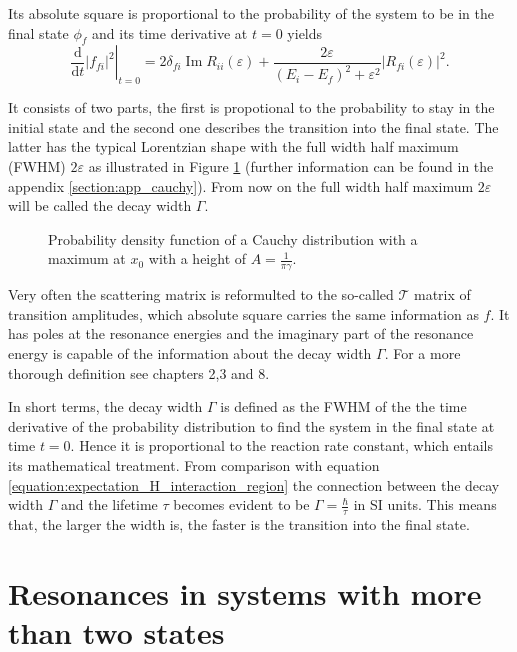 Its absolute square is proportional to the probability of the system to be
in the final state $\phi_f$ and its time derivative at $t=0$ yields
\begin{equation}
  \left . \frac{\mathrm{d}}{\mathrm{d}t} |f_{fi}|^2 \right |_{t=0}
  = 2\delta_{fi} \operatorname{Im}R_{ii}(\varepsilon) 
    + \frac{2\varepsilon}{(E_i-E_f)^2+\varepsilon^2} |R_{fi}(\varepsilon)|^2 .
\end{equation}

It consists of two parts, the first is propotional to the probability to stay
in the initial state and the second one describes the transition into the
final state. The latter has the typical Lorentzian shape with the full width
half maximum
(FWHM) $2 \varepsilon$ as illustrated in Figure \ref{figure:general_resonance}
(further information can be found in the appendix
\ref{section:app_cauchy}). From now on
the full width half maximum ${2\varepsilon}$ will be called the
decay width $\Gamma$.

\begin{figure}[h]
  \centering
  
  \caption{Probability density function of a Cauchy distribution with a
           maximum at $x_0$ with a height of $A=\frac{1}{\pi\gamma}$.}
  \label{figure:general_resonance}
\end{figure}

Very often the scattering matrix is reformulted to the so-called $\mathcal{T}$
matrix of transition amplitudes, which absolute square carries the same information
as $f$. It has poles at the resonance energies and the imaginary part of
the resonance energy is capable of the information about the decay width $\Gamma$.
For a more thorough definition see \cite{Taylor87} chapters 2,3 and 8.

In short terms, the decay width $\Gamma$ is defined as the FWHM of the
the time derivative of the probability distribution to find the system in
the final state at time $t=0$. Hence it is proportional to the reaction rate
constant, which entails its mathematical treatment. 
From comparison with equation \ref{equation:expectation_H_interaction_region}
the connection between the decay width $\Gamma$ and the lifetime $\tau$ becomes
evident to be
$\Gamma=\frac \hbar \tau$ in SI units.
This means that, the larger the width is, the faster is the transition
into the final state.


\section{Resonances in systems with more than two states}

